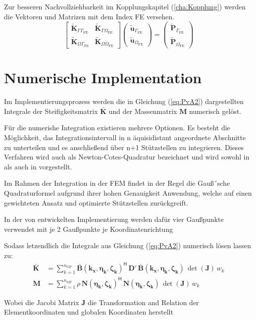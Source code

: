 Zur besseren Nachvollziehbarkeit im Kopplungskapitel (\ref{cha:Kopplung}) werden die Vektoren und Matrizen mit dem Index FE versehen.
\begin{equation}\label{eq:fe_block_system}
	\begin{bmatrix}
		\tilde{\mathbf K}_{\Gamma\Gamma_{\mathrm{FE}}} & \tilde{\mathbf K}_{\Gamma\Omega_{\mathrm{FE}}} \\[6pt]
		\tilde{\mathbf K}_{\Omega\Gamma_{\mathrm{FE}}} & \tilde{\mathbf K}_{\Omega\Omega_{\mathrm{FE}}}
	\end{bmatrix}
	\begin{pmatrix}
		\tilde{\mathbf u}_{\Gamma_{\mathrm{FE}}} \\[2pt]
		\tilde{\mathbf u}_{\Omega_{\mathrm{FE}}}
	\end{pmatrix}
	=
	\begin{pmatrix}
		\tilde{\mathbf P}_{\Gamma_{\mathrm{FE}}} \\[2pt]
		\tilde{\mathbf P}_{\Omega_{\mathrm{FE}}}
	\end{pmatrix}
\end{equation}




\section{Numerische Implementation}
\label{sec:Numerik}

Im Implementierungsprozess werden die in Gleichung (\ref{eq:PvA2}) dargestellten Integrale der Steifigkeitsmatrix \(\bar{\mathbf{K}}\) und der Massenmatrix \(\mathbf M\) numerisch gelöst.

Für die numerishe Integration existieren mehrere Optionen. Es besteht die Möglichkeit, das Integrationsintervall in n äquisidistant angeordnete Abschnitte zu unterteilen und es anschließend über n+1 Stützstellen zu integrieren. Dieses Verfahren wird auch als Newton-Cotes-Quadratur bezeichnet und wird sowohl in \cite{Klein2003} als auch in \cite{Gross2023} vorgestellt.

Im Rahmen der Integration in der FEM findet in der Regel die Gauß´sche Quadraturformel aufgrund ihrer hohen Genauigkeit Anwendung, welche auf einen gewichteten Ansatz und optimierte Stützstellen zurückgreift.

In der von \cite{Hackenberg2016} entwickelten Implementierung werden dafür vier Gaußpunkte verwendet mit je 2 Gaußpunkte je Koordinatenrichtung




Sodass letzendlich die Integrale aus Gleichung (\ref{eq:PvA2}) numerisch lösen lassen zu:
\begin{subequations}\label{eq:KM_1D_gp}
	\begin{align}
		\mathbf{\bar K}
		&= \sum_{k=1}^{n_{\mathrm{GP}}}
		\mathbf{\bar B(k_x,\eta_k,\zeta_k)}^{\mathsf H}\,
		\mathbf{D'}\,
		\mathbf{\bar B(k_x,\eta_k,\zeta_k)}\,
		\det(\bm J)\,w_k \label{eq:K_1D_gp}\\[0.5ex]
		\mathbf{M}
		&= \sum_{k=1}^{n_{\mathrm{GP}}}
		\rho\,
		\mathbf{N(\eta_k,\zeta_k)}^{\mathsf H}\,
		\mathbf{N(\eta_k,\zeta_k)}\,
		\det(\bm J)\,w_k \label{eq:M_1D_gp}
	\end{align}
\end{subequations}

Wobei die Jacobi Matrix $\bm J$ die Transformation and Relation der Elementkoordinaten und globalen Koordinaten herstellt